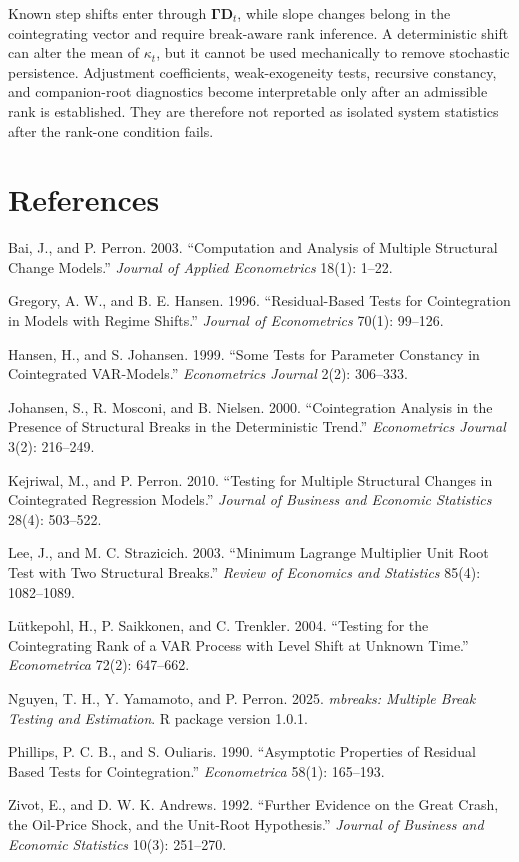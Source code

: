 \documentclass[11pt,a4paper]{article}
\begin{document}
Known step shifts enter through \(\boldsymbol{\Gamma}\mathbf D_t\), while
slope changes belong in the cointegrating vector and require break-aware rank
inference. A deterministic shift can alter the mean of \(\kappa_t\), but it
cannot be used mechanically to remove stochastic persistence. Adjustment
coefficients, weak-exogeneity tests, recursive constancy, and companion-root
diagnostics become interpretable only after an admissible rank is established.
They are therefore not reported as isolated system statistics after the
rank-one condition fails.

\FloatBarrier
\clearpage
\section{References}

\begin{description}
\setlength{\itemsep}{2pt}
\item Bai, J., and P. Perron. 2003. ``Computation and Analysis of Multiple
Structural Change Models.'' \emph{Journal of Applied Econometrics}
18(1): 1--22.
\item Gregory, A. W., and B. E. Hansen. 1996. ``Residual-Based Tests for
Cointegration in Models with Regime Shifts.'' \emph{Journal of Econometrics}
70(1): 99--126.
\item Hansen, H., and S. Johansen. 1999. ``Some Tests for Parameter Constancy
in Cointegrated VAR-Models.'' \emph{Econometrics Journal} 2(2): 306--333.
\item Johansen, S., R. Mosconi, and B. Nielsen. 2000. ``Cointegration Analysis
in the Presence of Structural Breaks in the Deterministic Trend.''
\emph{Econometrics Journal} 3(2): 216--249.
\item Kejriwal, M., and P. Perron. 2010. ``Testing for Multiple Structural
Changes in Cointegrated Regression Models.'' \emph{Journal of Business and
Economic Statistics} 28(4): 503--522.
\item Lee, J., and M. C. Strazicich. 2003. ``Minimum Lagrange Multiplier Unit
Root Test with Two Structural Breaks.'' \emph{Review of Economics and
Statistics} 85(4): 1082--1089.
\item L\"utkepohl, H., P. Saikkonen, and C. Trenkler. 2004. ``Testing for the
Cointegrating Rank of a VAR Process with Level Shift at Unknown Time.''
\emph{Econometrica} 72(2): 647--662.
\item Nguyen, T. H., Y. Yamamoto, and P. Perron. 2025. \emph{mbreaks:
Multiple Break Testing and Estimation}. R package version 1.0.1.
\item Phillips, P. C. B., and S. Ouliaris. 1990. ``Asymptotic Properties of
Residual Based Tests for Cointegration.'' \emph{Econometrica}
58(1): 165--193.
\item Zivot, E., and D. W. K. Andrews. 1992. ``Further Evidence on the Great
Crash, the Oil-Price Shock, and the Unit-Root Hypothesis.''
\emph{Journal of Business and Economic Statistics} 10(3): 251--270.
\end{description}
\end{document}
